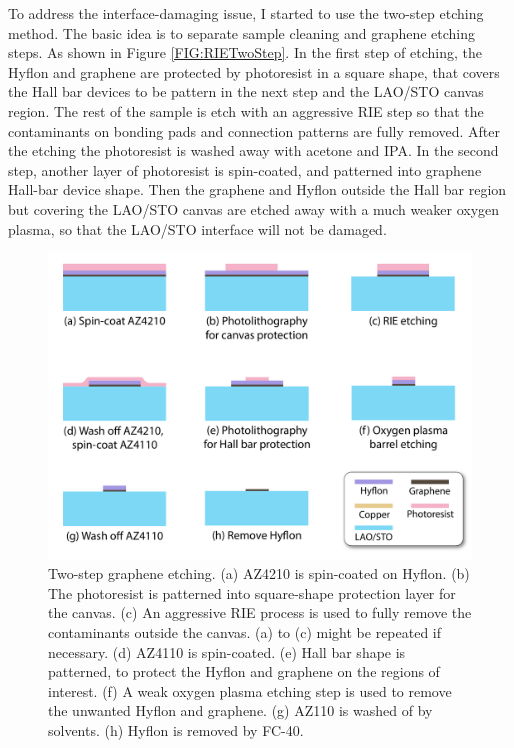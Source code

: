\documentclass[pdflatex, sectionletters, 12pt]{pittetd}    %
\begin{document}
To address the interface-damaging issue, I started to use the two-step etching method. The basic idea is to separate sample cleaning and graphene etching steps. As shown in Figure \ref{FIG:RIETwoStep}. In the first step of etching, the Hyflon and graphene are protected by photoresist in a square shape, that covers the Hall bar devices to be pattern in the next step and the LAO/STO canvas region. The rest of the sample is etch with an aggressive RIE step so that the contaminants on bonding pads and connection patterns are fully removed. After the etching the photoresist is washed away with acetone and IPA. In the second step, another layer of photoresist is spin-coated, and patterned into graphene Hall-bar device shape. Then the graphene and Hyflon outside the Hall bar region but covering the LAO/STO canvas are etched away with a much weaker oxygen plasma, so that the LAO/STO interface will not be damaged.

\begin{figure}[p]
	\centering
	\includegraphics[width=1\textwidth]{Drawing/TwoStepEtching.pdf}
	\caption{Two-step graphene etching. (a) AZ4210 is spin-coated on Hyflon. (b) The photoresist is patterned into square-shape protection layer for the canvas. (c) An aggressive RIE process is used to fully remove the contaminants outside the canvas. (a) to (c) might be repeated if necessary. (d) AZ4110 is spin-coated. (e) Hall bar shape is patterned, to protect the Hyflon and graphene on the regions of interest. (f) A weak oxygen plasma etching step is used to remove the unwanted Hyflon and graphene. (g) AZ110 is washed of by solvents. (h) Hyflon is removed by FC-40.}
	\label{FIG:TwoStepEtching}
\end{figure}
\end{document}
